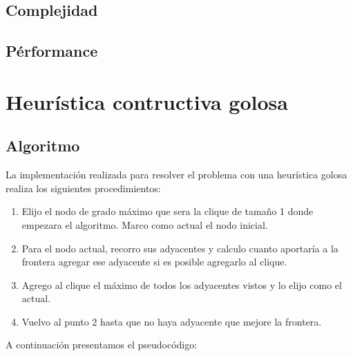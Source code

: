 \documentclass[a4paper, 10pt, twoside]{article}
\begin{document}
\subsection{Complejidad}

\subsection{Pérformance}


\newpage

\section{Heurística contructiva golosa}
\subsection{Algoritmo}
La implementación realizada para resolver el problema con una heurística golosa realiza los siguientes procedimientos:
\begin{enumerate}
\item Elijo el nodo de grado máximo que sera la clique de tamaño 1 donde empezara el algoritmo. Marco como actual el nodo inicial.
\item Para el nodo actual, recorro sus adyacentes y calculo cuanto aportaría a la frontera agregar ese adyacente si es posible agregarlo al clique.
\item Agrego al clique el máximo de todos los adyacentes vistos y lo elijo como el actual.
\item Vuelvo al punto 2 hasta que no haya adyacente que mejore la frontera.
\end{enumerate}

A continuación presentamos el pseudocódigo:
\end{document}
